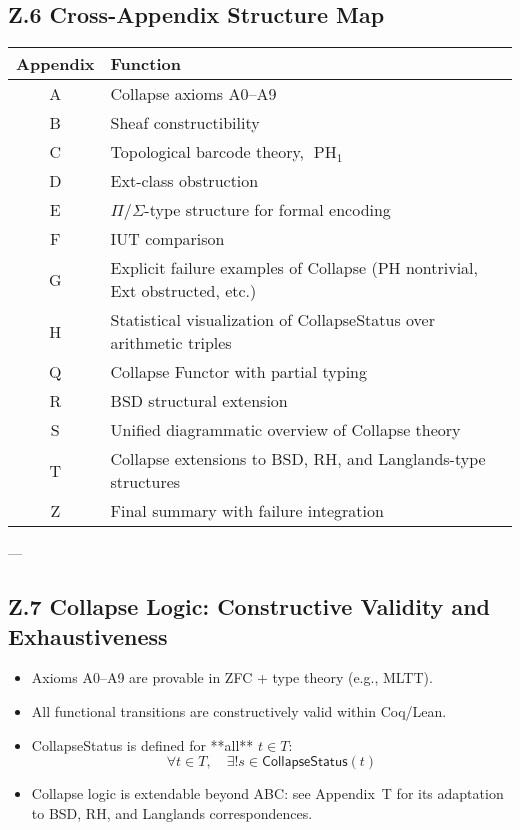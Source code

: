 \documentclass[11pt]{article}
\DeclareMathOperator{\PH}{PH}
\begin{document}
\subsection*{Z.6 Cross-Appendix Structure Map}

\begin{center}
\begin{tabular}{|c|p{10cm}|}
\hline
\textbf{Appendix} & \textbf{Function} \\
\hline
A & Collapse axioms A0--A9 \\
\hline
B & Sheaf constructibility \\
\hline
C & Topological barcode theory, \( \PH_1 \) \\
\hline
D & Ext-class obstruction \\
\hline
E & \( \Pi/\Sigma \)-type structure for formal encoding \\
\hline
F & IUT comparison \\
\hline
G & Explicit failure examples of Collapse (PH nontrivial, Ext obstructed, etc.) \\
\hline
H & Statistical visualization of CollapseStatus over arithmetic triples \\
\hline
Q & Collapse Functor with partial typing \\
\hline
R & BSD structural extension \\
\hline
S & Unified diagrammatic overview of Collapse theory \\
\hline
T & Collapse extensions to BSD, RH, and Langlands-type structures \\
\hline
Z & Final summary with failure integration \\
\hline
\end{tabular}
\end{center}

---

\subsection*{Z.7 Collapse Logic: Constructive Validity and Exhaustiveness}

\begin{itemize}
  \item Axioms A0--A9 are provable in ZFC + type theory (e.g., MLTT).
  \item All functional transitions are constructively valid within Coq/Lean.
  \item CollapseStatus is defined for **all** \( t \in T \):  
  \[
  \forall t \in T,\quad \exists! s \in \mathsf{CollapseStatus}(t)
  \]
  \item Collapse logic is extendable beyond ABC: see Appendix~T for its adaptation to BSD, RH, and Langlands correspondences.
\end{itemize}
\end{document}
